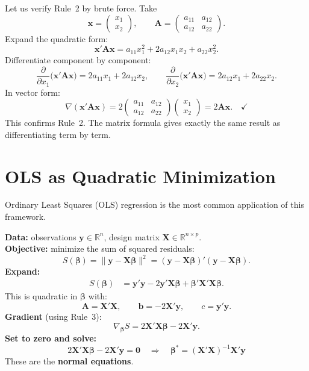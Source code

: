 \documentclass[11pt,a4paper]{article}
\begin{document}
Let us verify Rule~2 by brute force. Take
\[
\bm{x} = \begin{pmatrix} x_1 \\ x_2 \end{pmatrix}, \qquad
\bm{A} = \begin{pmatrix} a_{11} & a_{12} \\ a_{12} & a_{22} \end{pmatrix}.
\]
Expand the quadratic form:
\[
\bm{x}'\bm{A}\bm{x}
= a_{11}x_1^2 + 2a_{12}x_1 x_2 + a_{22}x_2^2.
\]
Differentiate component by component:
\[
\frac{\partial}{\partial x_1}\bigl(\bm{x}'\bm{A}\bm{x}\bigr) = 2a_{11}x_1 + 2a_{12}x_2, \qquad
\frac{\partial}{\partial x_2}\bigl(\bm{x}'\bm{A}\bm{x}\bigr) = 2a_{12}x_1 + 2a_{22}x_2.
\]
In vector form:
\[
\nabla(\bm{x}'\bm{A}\bm{x}) = 2\begin{pmatrix} a_{11} & a_{12} \\ a_{12} & a_{22} \end{pmatrix}\begin{pmatrix} x_1 \\ x_2 \end{pmatrix} = 2\bm{A}\bm{x}. \quad \checkmark
\]
This confirms Rule~2. The matrix formula gives exactly the same result as differentiating term by term.

\section{OLS as Quadratic Minimization}

Ordinary Least Squares (OLS) regression is the most common application of this framework.

\begin{formaldef}
\textbf{Data:} observations $\bm{y} \in \mathbb{R}^n$, design matrix $\bm{X} \in \mathbb{R}^{n \times p}$.\\
\textbf{Objective:} minimize the sum of squared residuals:
\[
S(\bm{\beta}) = \|\bm{y} - \bm{X}\bm{\beta}\|^2 = (\bm{y} - \bm{X}\bm{\beta})'(\bm{y} - \bm{X}\bm{\beta}).
\]
\textbf{Expand:}
\begin{align*}
S(\bm{\beta}) &= \bm{y}'\bm{y} - 2\bm{y}'\bm{X}\bm{\beta} + \bm{\beta}'\bm{X}'\bm{X}\bm{\beta}.
\end{align*}
This is quadratic in $\bm{\beta}$ with:
\[
\bm{A} = \bm{X}'\bm{X}, \qquad \bm{b} = -2\bm{X}'\bm{y}, \qquad c = \bm{y}'\bm{y}.
\]
\textbf{Gradient} (using Rule~3):
\[
\nabla_{\bm{\beta}} S = 2\bm{X}'\bm{X}\bm{\beta} - 2\bm{X}'\bm{y}.
\]
\textbf{Set to zero and solve:}
\[
2\bm{X}'\bm{X}\bm{\beta} - 2\bm{X}'\bm{y} = \bm{0} \quad \Longrightarrow \quad \boxed{\bm{\beta}^* = (\bm{X}'\bm{X})^{-1}\bm{X}'\bm{y}}
\]
These are the \textbf{normal equations}.
\end{formaldef}
\end{document}
